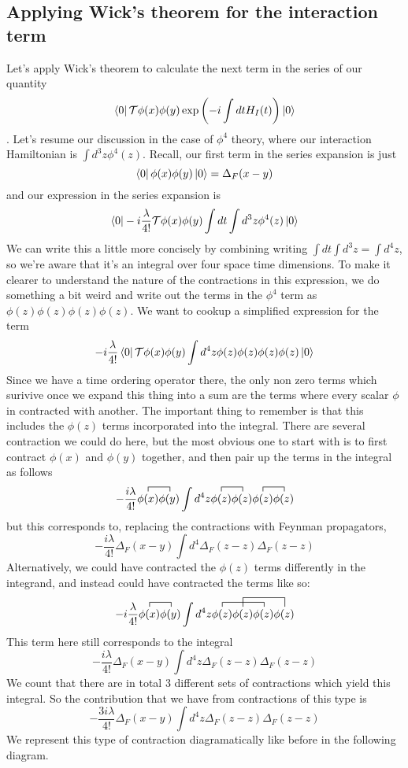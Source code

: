 \subsection{Applying Wick's theorem for the interaction term}
Let's apply Wick's theorem to calculate the next term in the series of our quantity \[ \bra{0} \mathcal{T} \phi(x) \phi(y) \exp \left(  -i  \int dt H_I(t) \right) \ket{0} \] . Let's resume our discussion in the case of $\phi^4$ theory, where our interaction Hamiltonian is $\int d^3 z \phi^4(z) $. Recall, our first term in the series expansion is just \[ \bra{0} \phi(x) \phi(y) \ket{0} = \Delta_F(x -y)  \] and our expression in the series expansion is \[ \bra{0} -i\frac{ \lambda} { 4!}   \mathcal{T} \phi(x) \phi(y)  \int dt \int d^3 z \phi^4 (z) \ket{0} \]       
We can write this a little more concisely by combining writing $\int dt \int d^3z = \int d^4 z$, so we're aware that it's an integral over four space time dimensions. To make it clearer to understand the nature of the contractions in this expression, we do something a bit weird and write out the terms in the $\phi^4$ term as $\phi(z)\phi(z)\phi(z) \phi(z)$. 
We want to cookup a simplified expression for the term \[  - i \frac{ \lambda} {4!} \bra{0}\mathcal{T} \phi(x) \phi(y) \int d^4 z \phi(z) \phi(z) \phi(z) \phi(z) \ket{0} \] Since we have a time ordering operator there, the only non zero terms which surivive once we expand this thing into a sum are the terms where every scalar $\phi$ in contracted with another. The important thing to remember is that this includes the $\phi(z) $ terms incorporated into the integral. There are several contraction we could do here, but the most obvious one to start with is to first contract $\phi(x)$ and $\phi(y)$ together, and then pair up the terms in the integral as follows \[ 
- \frac{ i \lambda} { 4!} \contraction{}{\phi(x) }{} { \phi(y) } \phi(x) \phi(y) \int d^4 z \contraction{}{\phi(z)}{} { \phi(z) } \phi(z) \phi(z) \contraction{}{\phi(z) }{}{\phi(z) } \phi(z) \phi(z) \] but this corresponds to, replacing the contractions with Feynman propagators, \[ - \frac{i \lambda} { 4!} \Delta_F( x - y ) \int d^4 \Delta_F(z - z) \Delta_F(z - z) \] 
Alternatively, we could have contracted the $\phi(z)$ terms differently in the integrand, and instead could have contracted the terms like so: 
\[ - i \frac{ \lambda} { 4!} \contraction{}{\phi(x) }{ } {\phi(y) } \phi(x) \phi(y)  \int d^4 z \contraction{} {\phi(z)}{\phi(z)}{ \phi(z) }  \contraction[2ex]{\phi(z)}{\phi(z)}{\phi(z)}{\phi(z) } \phi(z) \phi(z) \phi(z) \phi(z) \] 
This term here still corresponds to the integral  \[ - \frac{i \lambda} { 4!} \Delta_F( x - y ) \int d^4 z \Delta_F(z - z) \Delta_F(z - z) \]
We count that there are in total 3 different sets of contractions which yield this integral. So the contribution that we have from contractions of this type is  \[ - \frac{3 i \lambda} { 4!} \Delta_F( x - y ) \int d^4 z  \Delta_F(z - z) \Delta_F(z - z) \]   
We represent this type of contraction diagramatically like before in the following diagram.

